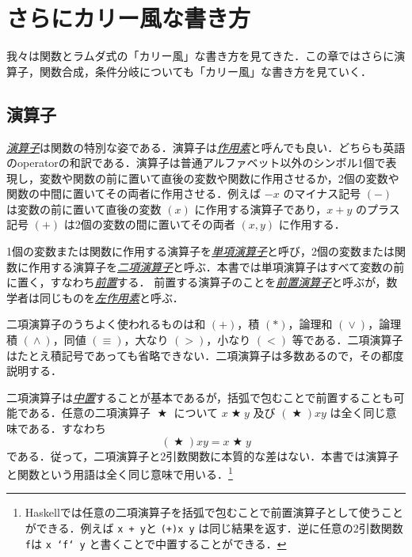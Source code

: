 \documentclass[a4paper]{jsbook}
\newcommand{\programminglanguage}[1]{\textsf{#1}}
\newcommand{\haskell}{\programminglanguage{Haskell}}
\newenvironment{leader}{\begingroup}{\endgroup}
\newcommand{\keyword}[1]{{\underline{\emph{#1}}}}
\newcommand{\code}[1]{\texttt{#1}}
\DeclareMathOperator{\mBinOp}{\bigstar}
\DeclareMathOperator{\mLogicalAnd}{\wedge}
\DeclareMathOperator{\mLogicalOr}{\vee}
\begin{document}
\chapter{さらにカリー風な書き方}

\begin{leader}
我々は関数とラムダ式の「カリー風」な書き方を見てきた．この章ではさらに演算子，関数合成，条件分岐についても「カリー風」な書き方を見ていく．
\end{leader}

\section{演算子}

\keyword{演算子}は関数の特別な姿である．演算子は\keyword{作用素}と呼んでも良い．どちらも英語のoperatorの和訳である．演算子は普通アルファベット以外のシンボル1個で表現し，変数や関数の前に置いて直後の変数や関数に作用させるか，2個の変数や関数の中間に置いてその両者に作用させる．例えば $-x$ のマイナス記号 $(-)$ は変数の前に置いて直後の変数 $(x)$ に作用する演算子であり，$x+y$ のプラス記号 $(+)$ は2個の変数の間に置いてその両者 $(x,y)$ に作用する．

1個の変数または関数に作用する演算子を\keyword{単項演算子}と呼び，2個の変数または関数に作用する演算子を\keyword{二項演算子}と呼ぶ．本書では単項演算子はすべて変数の前に置く，すなわち\keyword{前置}する．
前置する演算子のことを\keyword{前置演算子}と呼ぶが，数学者は同じものを\keyword{左作用素}と呼ぶ．

二項演算子のうちよく使われるものは和 $(+)$，積 $(*)$，論理和 $(\mLogicalOr)$，論理積 $(\mLogicalAnd)$，同値 $(\equiv)$，大なり $(>)$，小なり $(<)$ 等である．二項演算子はたとえ積記号であっても省略できない．二項演算子は多数あるので，その都度説明する．

二項演算子は\keyword{中置}することが基本であるが，括弧で包むことで前置することも可能である．任意の二項演算子 $\mBinOp$ について $x\mBinOp y$ 及び $(\mBinOp)xy$ は全く同じ意味である．すなわち
\begin{equation}
\left(\mBinOp\right)xy=x\mBinOp y
\end{equation}
である．従って，二項演算子と2引数関数に本質的な差はない．本書では演算子と関数という用語は全く同じ意味で用いる．\footnote{\haskell では任意の二項演算子を括弧で包むことで前置演算子として使うことができる．例えば \code{x + y}と \code{(+)x y} は同じ結果を返す．逆に任意の2引数関数 \code{f}は \code{x `f` y} と書くことで中置することができる．}
\end{document}
